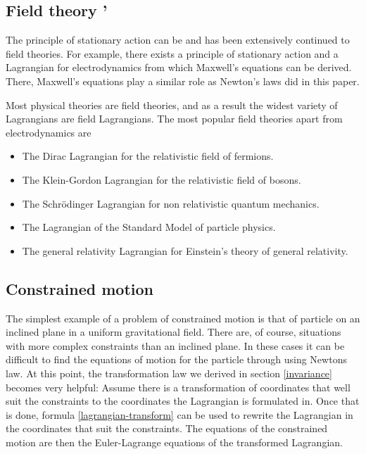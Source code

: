 \documentclass[prb,preprint]{revtex4-1}
\begin{document}
\subsection{Field theory \cite{Sterman}'\cite{Dirac}} \label{field.theory}
The principle of stationary action can be and has been extensively continued to field theories. For example, there exists a principle of stationary action and a Lagrangian for electrodynamics from which Maxwell's equations can be derived. There, Maxwell's equations play a similar role as Newton's laws did in this paper.

Most physical theories are field theories, and as a result the widest variety of Lagrangians are field Lagrangians. The most popular field theories apart from electrodynamics are
\begin{itemize}
  \item The Dirac Lagrangian for the relativistic field of fermions.
  \item The Klein-Gordon Lagrangian for the relativistic field of bosons.
  \item The Schr{\"o}dinger Lagrangian for non relativistic quantum mechanics.
  \item The Lagrangian of the Standard Model of particle physics.
  \item The general relativity Lagrangian for Einstein's theory of general relativity.
\end{itemize}


\subsection{Constrained motion \cite{Kuypers}}
The simplest example of a problem of constrained motion is that of particle on an inclined plane in a uniform gravitational field. There are, of course, situations with more complex constraints than an inclined plane. In these cases it can be difficult to find the equations of motion for the particle through using Newtons law. At this point, the transformation law we derived in section \ref{invariance} becomes very helpful: Assume there is a transformation of coordinates that well suit the constraints to the coordinates the Lagrangian is formulated in. Once that is done, formula \ref{lagrangian-transform} can be used to rewrite the Lagrangian in the coordinates that suit the constraints. The equations of the constrained motion are then the Euler-Lagrange equations of the transformed Lagrangian.



\end{document}
